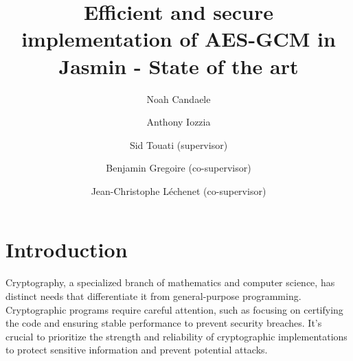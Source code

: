 \documentclass[runningheads]{llncs}
\begin{document}
%
\title{Efficient and secure implementation of AES-GCM in Jasmin - State of the art}


%
%
\author{Noah Candaele \and Anthony Iozzia \and Sid Touati (supervisor) \and Benjamin Gregoire (co-supervisor) \and Jean-Christophe Léchenet (co-supervisor)}

%
%



%
\maketitle              %
%

\thispagestyle{plain} %

%

%
%
%

\section{Introduction}

Cryptography, a specialized branch of mathematics and computer science, has distinct needs that differentiate it from general-purpose programming. Cryptographic programs require careful attention, such as focusing on certifying the code and ensuring stable performance to prevent security breaches. It's crucial to prioritize the strength and reliability of cryptographic implementations to protect sensitive information and prevent potential attacks.
\end{document}
